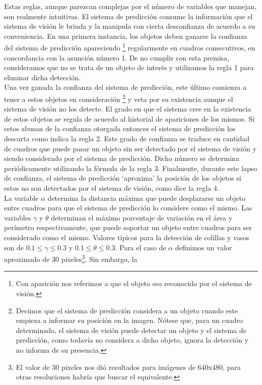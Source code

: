 Estas reglas, aunque parezcan complejas por el n\'umero de variables que 
manejan, son realmente intuitivas. El sistema de predicci\'on consume la 
informaci\'on que el sistema de visi\'on le brinda y la manipula con 
cierta desconfianza de acuerdo a su 
conveniencia. En una primera instancia, los objetos deben ganarse la 
confianza del sistema de predicci\'on apareciendo \footnote{Con 
aparici\'on nos referimos a que el objeto sea reconocido por el sistema 
de visi\'on.} regularmente en 
cuadros consecutivos, en concordancia con la asunci\'on n\'umero 
1. De no cumplir con esta premisa, consideramos que no se trata de un 
objeto de inter\'es y utilizamos la regla 1 para eliminar dicha detecci\'on. \\
	Una vez ganada la confianza del sistema de predicci\'on, este 
	\'ultimo comienza a tener a estos objetos en consideraci\'on 
	\footnote{Decimos que el sistema de predicci\'on considera a un 
	objeto cuando este empieza a informar su posici\'on en la 
	imagen. N\'otese que, para un cuadro determinado, el sistema de 
	visi\'on puede detectar un objeto y el sistema de predicci\'on, como 
	todav\'ia no considera a dicho objeto, ignora la detecci\'on y no informa de su 
	presencia.} y veta por su 
existencia aunque el sistema de visi\'on no los detecte. El grado en que 
el sistema cree en la existencia de estos objetos se regula de 
acuerdo al historial de apariciones de los mismos. Si estos abusan de 
la confianza otorgada entonces el sistema de predicci\'on los descarta 
como indica la regla 2. 
Este grado de confianza se traduce en cantidad de 
cuadros que puede pasar un objeto sin ser detectado por el sistema de 
visi\'on y siendo considerado por el sistema de predicci\'on. Dicho 
n\'umero se determina peri\'odicamente utilizando la f\'ormula de la regla 3.
Finalmente, durante este lapso de confianza, el sistema de predicci\'on 
`aproxima' la posici\'on de los objetos si estos no son detectados por el 
sistema de visi\'on, como dice la regla 4. \\
\indent La variable $\alpha$ determina la distancia m\'axima que puede 
desplazarse un objeto entre cuadros para que el sistema de predicci\'on lo considere 
como el mismo. Las variables $\gamma$ y $\theta$ determinan el m\'aximo 
porcentaje de variaci\'on en el \'area y per\'imetro respectivamente, que puede soportar un 
objeto entre cuadros para ser considerado como el mismo. Valores 
t\'ipicos para la detecci\'on de colillas y vasos son de 
$0.1\leq\gamma\leq0.3$ y $0.1\leq\theta\leq0.3$. Para el caso de 
$\alpha$ definimos un valor aproximado de 30 pixeles\footnote{ El 
valor de 30 pixeles nos di\'o resultados para im\'agenes de 640x480, para 
otras resoluciones habr\'ia que buscar el equivalente.}. Sin embargo, la 
